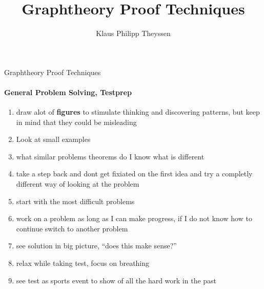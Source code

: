 \documentclass[a4paper]{article}
\title{Graphtheory Proof Techniques}
\author{Klaus Philipp Theyssen}
\begin{document}
\begin{center}
    \Large Graphtheory Proof Techniques
\end{center}


\paragraph{General Problem Solving, Testprep}
\begin{enumerate}
    \item draw alot of \textbf{figures} to stimulate thinking and discovering patterns,
    but keep in mind that they could be misleading
    \item Look at small examples 
    \item what similar problems theorems do I know what is different
    \item take a step back and dont get fixiated on the first idea and try 
    a completly different way of looking at the problem
    \item start with the most difficult problems
    \item work on a problem as long as I can make progress, if I do not know
    how to continue switch to another problem
    \item see solution in big picture, \enquote{does this make sense?}
    \item relax while taking test, focus on breathing 
    \item see test as sports event to show of all the hard work in the past
\end{enumerate}
\end{document}
